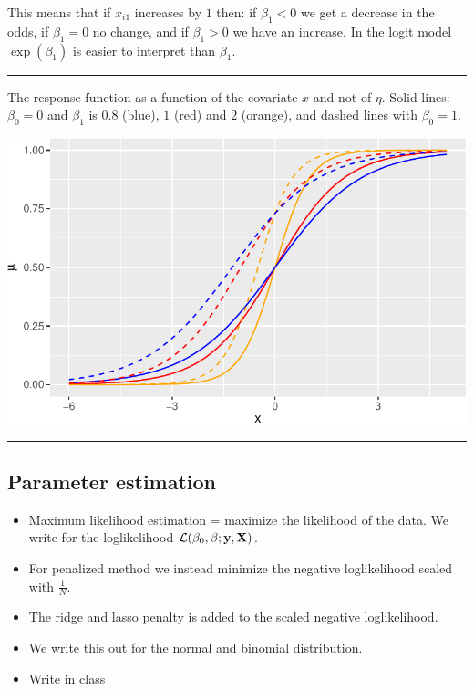 \documentclass[
  letterpaper,
  DIV=11,
  numbers=noendperiod]{scrartcl}
\begin{document}
This means that if \(x_{i1}\) increases by \(1\) then: if \(\beta_1<0\)
we get a decrease in the odds, if \(\beta_1=0\) no change, and if
\(\beta_1>0\) we have an increase. In the logit model \(\exp(\beta_1)\)
is easier to interpret than \(\beta_1\).

\begin{center}\rule{0.5\linewidth}{0.5pt}\end{center}

The response function as a function of the covariate \(x\) and not of
\(\eta\). Solid lines: \(\beta_0=0\) and \(\beta_1\) is \(0.8\) (blue),
\(1\) (red) and \(2\) (orange), and dashed lines with \(\beta_0=1\).

\includegraphics{L10_files/figure-pdf/unnamed-chunk-3-1.pdf}

\begin{center}\rule{0.5\linewidth}{0.5pt}\end{center}

\hypertarget{parameter-estimation}{%
\subsection{Parameter estimation}\label{parameter-estimation}}

\begin{itemize}
\item
  Maximum likelihood estimation = maximize the likelihood of the data.
  We write for the loglikelihood
  \({\cal L}(\beta_0,\beta; {\bf y}, {\bf X})\).
\item
  For penalized method we instead minimize the negative loglikelihood
  scaled with \(\frac{1}{N}\).
\item
  The ridge and lasso penalty is added to the scaled negative
  loglikelihood.
\item
  We write this out for the normal and binomial distribution.
\item
  Write in class
\end{itemize}
\end{document}
